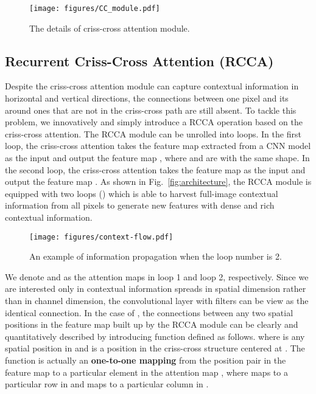 \documentclass[10pt,journal,compsoc]{IEEEtran}
\begin{document}
\begin{figure}[!t]
    \centering
    \texttt{[image: figures/CC\_module.pdf]}
    \caption{The details of criss-cross attention module.}
    \label{fig:cca_module}
\end{figure}


\subsection{Recurrent Criss-Cross Attention (RCCA)}

Despite the criss-cross attention module can capture contextual information in horizontal and vertical directions, the connections between one pixel and its around ones that are not in the criss-cross path are still absent. To tackle this problem, we innovatively and simply introduce a RCCA operation based on the criss-cross attention. The RCCA module can be unrolled into  loops. In the first loop, the criss-cross attention takes the feature map  extracted from a CNN model as the input and output the feature map , where  and  are with the same shape. In the second loop, the criss-cross attention takes the feature map  as the input and output the feature map . As shown in Fig.~\ref{fig:architecture}, the RCCA module is equipped with two loops () which is able to harvest full-image contextual information from all pixels to generate new features with dense and rich contextual information. 

\begin{figure}[!t]
    \centering
    \texttt{[image: figures/context-flow.pdf]}
    \caption{An example of information propagation when the loop number is 2.}
    \label{fig:alg2}
\end{figure}

We denote  and  as the attention maps in loop 1 and loop 2, respectively. Since we are interested only in contextual information spreads in spatial dimension rather than in channel dimension, the convolutional layer with  filters can be view as the identical connection. 
In the case of , the connections between any two spatial positions in the feature map built up by the RCCA module can be clearly and quantitatively described by introducing function  defined as follows.
{}
where  is any spatial position in
 and  is a position in the criss-cross structure centered at . The function  is actually an \textbf{one-to-one mapping} from the position pair  in the feature map to a particular element  in the attention map , where  maps to a particular row  in   and  maps to a particular column in .
\end{document}
